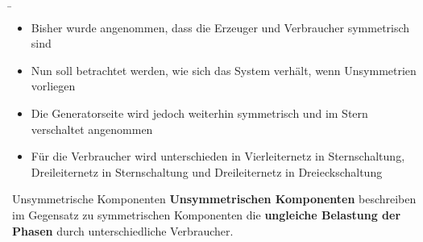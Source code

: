 \begin{frame}
    
    
    \b{
        \begin{itemize}
            \item Bisher wurde angenommen, dass die Erzeuger und Verbraucher symmetrisch sind
            \item Nun soll betrachtet werden, wie sich das System verhält, wenn Unsymmetrien vorliegen
            \item Die Generatorseite wird jedoch weiterhin symmetrisch und im Stern verschaltet angenommen
            \item Für die Verbraucher wird unterschieden in Vierleiternetz in Sternschaltung, Dreileiternetz in Sternschaltung und Dreileiternetz in Dreieckschaltung
        \end{itemize}
    }
\end{frame}

\begin{frame}
    
    \begin{Merksatz}{Unsymmetrische Komponenten}
        {\bf Unsymmetrischen Komponenten} beschreiben im Gegensatz zu symmetrischen Komponenten die {\bf ungleiche Belastung der
                Phasen} durch unterschiedliche Verbraucher. 
    \end{Merksatz}
\end{frame}

